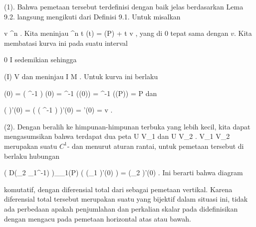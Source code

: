 {

\teilbeweis {}{}{}
{(1). Bahwa pemetaan tersebut terdefinisi dengan baik jelas berdasarkan
Lema 9.2.
langsung mengikuti dari
Definisi 9.1.
Untuk
misalkan

\mavergleichskette
{\vergleichskette
{ v
}
{ \in }{ \R^n
}
{  }{
}
{    }{
}
{   }{
}
}
{}{}{.}
Kita meninjau
\maabbeledisp {\theta} { \R } { \R^n
} { t } { \theta(t) =  \alpha(P) + t v
} {,}
yang
di $0$ tepat sama dengan $v$. Kita membatasi kurva ini pada suatu interval

\mavergleichskette
{\vergleichskette
{ 0
}
{ \in }{ I
}
{ \subseteq }{ \R
}
{    }{
}
{   }{
}
}
{}{}{}
sedemikian sehingga

\mavergleichskette
{\vergleichskette
{ \theta(I)
}
{ \subseteq }{ V
}
{  }{
}
{    }{
}
{   }{
}
}
{}{}{}
dan meninjau
 { I } { M
} {.}
Untuk kurva ini berlaku

\mavergleichskettedisp
{\vergleichskette
{ \gamma(0)
}
{ =} { \left(  \alpha^{-1} \circ \theta  \right) (0)
}
{ =} { \alpha^{-1} (\theta(0))
}
{ =} { \alpha^{-1} (\alpha(P))
}
{ =} { P
}
}
{}{}{}
dan

\mavergleichskettedisp
{\vergleichskette
{ \left(  \alpha \circ \gamma  \right)'(0)
}
{ =} { \left(  \alpha \circ \left(  \alpha^{-1} \circ \theta  \right)  \right)'(0)
}
{ =} { \theta'(0)
}
{ =} { v
}
{ } {
}
}
{}{}{.}}
{}
\teilbeweis {}{}{}
{(2). Dengan beralih ke himpunan-himpunan terbuka yang lebih kecil, kita dapat mengasumsikan bahwa terdapat dua peta
 { U } { V_1
} {}
dan
 { U } { V_2
} {}
.
 { V_1 } { V_2
} {}
merupakan suatu
$C^1$-
dan menurut
aturan rantai,
untuk
pemetaan tersebut di
berlaku hubungan

\mavergleichskettedisp
{\vergleichskette
{ \left(  D(\alpha_2 \circ \alpha_1^{-1})  \right)_{\alpha_1(P)} \left(   (\alpha_1 \circ \gamma)'(0)   \right)
}
{ =} { (\alpha_2 \circ \gamma)'(0)
}
{ } {
}
{ } {
}
{ } {
}
}
{}{}{.}
Ini berarti bahwa diagram

 {  }

komutatif, dengan diferensial total dari
sebagai pemetaan vertikal. Karena diferensial total tersebut merupakan suatu
yang bijektif dalam situasi ini, tidak ada perbedaan apakah penjumlahan dan perkalian skalar pada
didefinisikan dengan mengacu pada pemetaan horizontal atas atau bawah.}
{}

}

